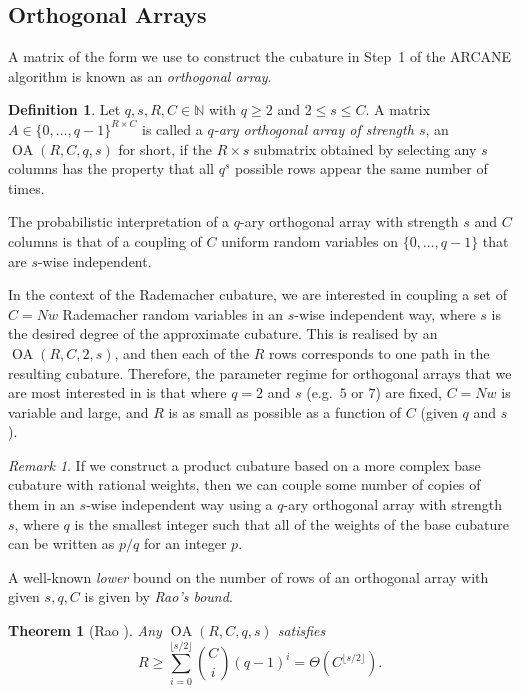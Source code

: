 \documentclass[11pt, letterpaper]{article}
\newtheorem{theorem}{Theorem}
\theoremstyle{definition}
\newtheorem{definition}{Definition}
\theoremstyle{remark}
\newtheorem{remark}{Remark}
\DeclareMathOperator{\OA}{OA}
\newcommand{\N}{\mathbb{N}}
\begin{document}
\begin{appendices}
\clearpage
\section{Orthogonal Arrays}
A matrix of the form we use to construct the cubature in Step~1 of the ARCANE algorithm is known as an \emph{orthogonal array}.

\begin{definition}
    Let $q,s,R,C\in \N$ with $q \ge 2$ and $2 \le s \le C$. A matrix $A \in \{0,\ldots,q-1\}^{R \times C}$ is called a \emph{$q$-ary orthogonal array of strength $s$}, an $\OA(R, C, q, s)$ for short, if the $R \times s$ submatrix obtained by selecting any $s$ columns has the property that all $q^s$ possible rows appear the same number of times.
\end{definition}

The probabilistic interpretation of a $q$-ary orthogonal array with strength $s$ and $C$ columns is that of a coupling of $C$ uniform random variables on $\{0,\ldots,q-1\}$ that are $s$-wise independent.

In the context of the Rademacher cubature, we are interested in coupling a set of $C = Nw$ Rademacher random variables in an $s$-wise independent way, where $s$ is the desired degree of the approximate cubature.
This is realised by an $\OA(R,C,2,s)$, and then each of the $R$ rows corresponds to one path in the resulting cubature. Therefore, the parameter regime for orthogonal arrays that we are most interested in is that where $q = 2$ and $s$ (e.g.\ $5$ or $7$) are fixed, $C = Nw$ is variable and large, and $R$ is as small as possible as a function of $C$ (given $q$ and $s$).

\begin{remark}
    If we construct a product cubature based on a more complex base cubature with rational weights, then we can couple some number of copies of them in an $s$-wise independent way using a $q$-ary orthogonal array with strength $s$, where $q$ is the smallest integer such that all of the weights of the base cubature can be written as $p / q$ for an integer $p$.
\end{remark}

A well-known \emph{lower} bound on the number of rows of an orthogonal array with given $s,q,C$ is given by \emph{Rao's bound}.

\begin{theorem}[Rao \cite{rao1947}]
    Any $\OA(R,C,q,s)$ satisfies 
    \begin{equation}\label{eq:rao}
    R \ge \sum_{i=0}^{\lfloor s/2 \rfloor} \binom{C}{i} (q-1)^i = \Theta \left( C^{\lfloor s/2\rfloor}\right).
    \end{equation}
\end{theorem}


\end{appendices}
\end{document}
